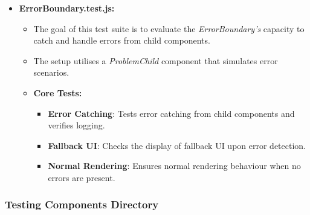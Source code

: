 \begin{itemize}
    \item \textbf{ErrorBoundary.test.js:}
    \begin{itemize}
        \item The goal of this test suite is to evaluate the \textit{ErrorBoundary's} capacity to catch and handle errors from child components.
        \item The setup utilises a \textit{ProblemChild} component that simulates error scenarios.
        \item \textbf{Core Tests:}
        \begin{itemize}
            \item \textbf{Error Catching}: Tests error catching from child components and verifies logging.
            \item \textbf{Fallback UI}: Checks the display of fallback UI upon error detection.
            \item \textbf{Normal Rendering}: Ensures normal rendering behaviour when no errors are present.
        \end{itemize}
    \end{itemize}
\end{itemize}

\subsubsection{Testing Components Directory}

